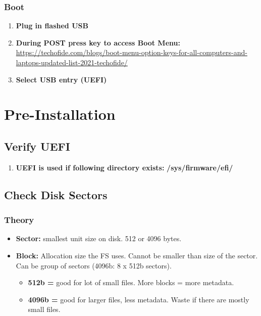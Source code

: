 \documentclass[10pt, a4paper, onecolumn, oneside, titlepage, openany]{book}
\begin{document}
\subsection{Boot}
\begin{enumerate}
    \item \textbf{Plug in flashed USB}
    \item \textbf{During POST press key to access Boot Menu:}
\newline \href{https://techofide.com/blogs/boot-menu-option-keys-for-all-computers-and-laptops-updated-list-2021-techofide/}{https://techofide.com/blogs/boot-menu-option-keys-for-all-computers-and-laptops-updated-list-2021-techofide/}
    \item \textbf{Select USB entry (UEFI)}
\end{enumerate}


\chapter{Pre-Installation}
\section{Verify UEFI}
\begin{enumerate}
    \item \textbf{UEFI is used if following directory exists:}
\newline \textbf{\textcolor{dir}{/sys/firmware/efi/}}
\end{enumerate}

\section{Check Disk Sectors}
\subsection{Theory}
\begin{itemize}
    \item \textbf{Sector:} smallest unit size on disk. 512 or 4096 bytes.
    \item \textbf{Block:} Allocation size the FS uses. Cannot be smaller than size of the sector. Can be group of sectors (4096b: 8 x 512b sectors).
    \begin{itemize}
        \item \textbf{512b =} good for lot of small files. More blocks = more metadata.
        \item \textbf{4096b =}  good for larger files, less metadata. Waste if there are mostly small files.
    \end{itemize}
\end{itemize}
\end{document}
